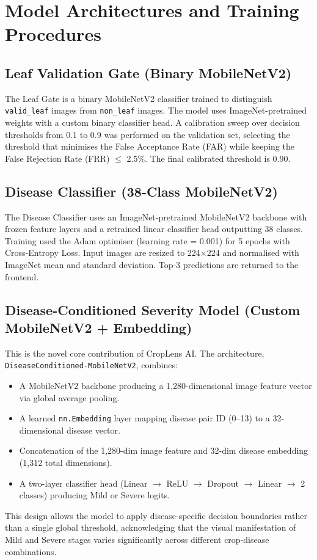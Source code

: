 \section{Model Architectures and Training Procedures}

\subsection{Leaf Validation Gate (Binary MobileNetV2)}

The Leaf Gate is a binary MobileNetV2 classifier trained to distinguish \texttt{valid\_leaf} images from \texttt{non\_leaf} images. The model uses ImageNet-pretrained weights with a custom binary classifier head. A calibration sweep over decision thresholds from 0.1 to 0.9 was performed on the validation set, selecting the threshold that minimises the False Acceptance Rate (FAR) while keeping the False Rejection Rate (FRR) $\leq$ 2.5\%. The final calibrated threshold is 0.90.

\subsection{Disease Classifier (38-Class MobileNetV2)}

The Disease Classifier uses an ImageNet-pretrained MobileNetV2 backbone with frozen feature layers and a retrained linear classifier head outputting 38 classes. Training used the Adam optimiser (learning rate = 0.001) for 5 epochs with Cross-Entropy Loss. Input images are resized to 224$\times$224 and normalised with ImageNet mean and standard deviation. Top-3 predictions are returned to the frontend.

\subsection{Disease-Conditioned Severity Model (Custom MobileNetV2 + Embedding)}

This is the novel core contribution of CropLens AI. The architecture, \texttt{DiseaseConditioned-}\allowbreak\texttt{MobileNetV2}, combines:
\begin{itemize}
    \item A MobileNetV2 backbone producing a 1,280-dimensional image feature vector via global average pooling.
    \item A learned \texttt{nn.Embedding} layer mapping disease pair ID (0--13) to a 32-dimensional disease vector.
    \item Concatenation of the 1,280-dim image feature and 32-dim disease embedding (1,312 total dimensions).
    \item A two-layer classifier head (Linear $\rightarrow$ ReLU $\rightarrow$ Dropout $\rightarrow$ Linear $\rightarrow$ 2 classes) producing Mild or Severe logits.
\end{itemize}
This design allows the model to apply disease-specific decision boundaries rather than a single global threshold, acknowledging that the visual manifestation of Mild and Severe stages varies significantly across different crop-disease combinations.

